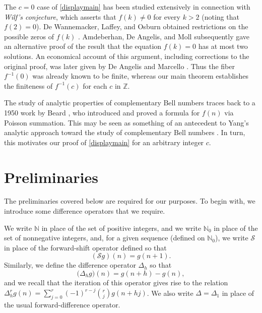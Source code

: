 \documentclass[11pt,letterpaper]{amsart}
\begin{document}
 The \(c=0\) case of \eqref{displaymain} has been studied extensively in connection with \emph{Wilf's conjecture}, 
 which asserts that 
\(f(k)\neq 0\) for every \(k>2\) (noting that $f(2)=0$). 
 De Wannemacker, Laffey, and Osburn
obtained restrictions on the possible zeros of
\(f(k)\) \cite{DeWannemackerLaffeyOsburn2007}. Amdeberhan, De Angelis,
and Moll \cite{AmdeberhanDeAngelisMoll2013} subsequently gave an alternative proof of the
result that the equation \(f(k)=0\) has at most two solutions. 
 An economical
account of this argument, including corrections to the original proof,
was later given by De Angelis and Marcello
\cite{DeAngelisMarcello2016}. Thus the fiber \(f^{-1}(0)\) was already
known to be finite, whereas our main theorem establishes the finiteness
of $f^{-1}(c)$ for each $c$ in $\mathbb{Z}$.
 
 The study of analytic properties of complementary Bell numbers traces back
 to a 1950 work by Beard \cite{Beard1950}, who introduced and proved a formula for $f(n)$ via Poisson summation. 
 This may be seen as something of an antecedent to Yang's analytic approach toward
 the study of complementary Bell numbers \cite{Yang2001}. In turn, this 
 motivates our proof of \eqref{displaymain} for an arbitrary integer $c$. 

 \section{Preliminaries}\label{secPrelim}
 The preliminaries covered below are required for our purposes. 
 To begin with, we introduce some difference operators that we require. 

 We write $\mathbb{N}$ in place of the set of positive integers, 
 and we write $\mathbb{N}_{0} $ in place of the 
 set of nonnegative integers, and, for a given sequence (defined on $\mathbb{N}_{0}$), 
 we write $\mathcal{S}$ in place
 of the forward-shift operator
 defined so that
\begin{equation}\label{definecalS}
 (\mathcal{S}g)(n) = g(n+1). 
\end{equation} 
 Similarly, we define the difference operator 
 $\Delta_h$ so that 
\begin{equation}\label{Deltahgn} 
 \big( \Delta_h g \big)(n) = g(n + h) - g(n), 
\end{equation} 
 and we recall that the iteration of this operator gives rise to the relation 
 $ \Delta_h^r g(n) = \sum_{j=0}^{r} (-1)^{r-j} \binom{r}{j} g(n + h j)$. 
 We also write $\Delta = \Delta_1$ in place of the usual forward-difference operator. 
\end{document}
